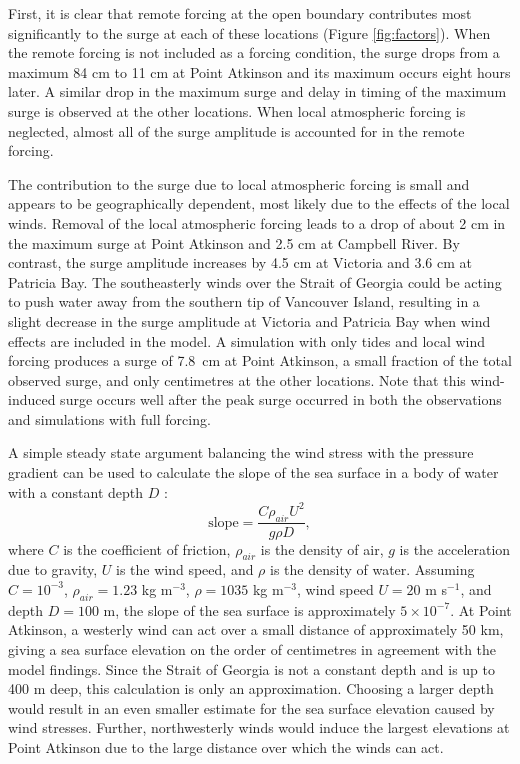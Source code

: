 \documentclass[letterpaper]{tATO2e}
\begin{document}
First, it is clear that remote forcing at the open boundary contributes most significantly to the surge at each of these locations (Figure \ref{fig:factors}). When the remote forcing is not included as a forcing condition, the surge drops from a maximum {\color{red}84 cm} to 11 cm at Point Atkinson and its maximum occurs eight hours later.  A similar drop in the maximum surge and delay in timing of the maximum surge is observed at the other locations.  When local atmospheric forcing is neglected, almost all of the surge amplitude is accounted for in the remote forcing.

The contribution to the surge due to local atmospheric forcing is small and appears to be geographically dependent, most likely due to the effects of the local winds. Removal of the local atmospheric forcing leads to a drop of about {\color{red}2 cm} in the maximum surge at Point Atkinson and {\color{red}2.5 cm} at Campbell River. By contrast, the surge amplitude increases by {\color{red} 4.5 cm} at Victoria and 3.6 cm at Patricia Bay. The southeasterly winds over the Strait of Georgia could be acting to push water away from the southern tip of Vancouver Island, resulting in a slight decrease in the surge amplitude at Victoria and Patricia Bay when wind effects are included in the model. A simulation with only tides and local wind forcing produces a surge of 7.8~cm at Point Atkinson, a small fraction of the total observed surge, and only centimetres at the other locations.  Note that this wind-induced surge occurs well after the peak surge occurred in both the observations and simulations with full forcing.

A simple steady state argument balancing the wind stress with the pressure gradient can be used to calculate the slope of the sea surface in a body of water with a constant depth $D$ \citep{pugh2004changing}: 
\begin{equation}
\text{slope} = \frac{C\rho_{air}U^2}{g\rho D},
\end{equation}
where $C$ is the coefficient of friction, $\rho_{air}$ is the density of air, $g$ is the acceleration due to gravity, $U$ is the wind speed, and $\rho$ is the density of water. Assuming  $C=10^{-3}$, $\rho_{air}=1.23$ kg m$^{-3}$, $\rho= 1035$  kg m$^{-3}$, wind speed $U=20$ m s$^{-1}$, and depth $D=100$ m, the slope of the sea surface is approximately $5\times10^{-7}$. At Point Atkinson, a westerly wind can act over a small distance of approximately 50 km, giving a sea surface elevation on the order of centimetres in agreement with the model findings. Since the Strait of Georgia is not a constant depth and is up to 400 m deep, this calculation is only an approximation. Choosing a larger depth would result in an even smaller estimate for the sea surface elevation caused by wind stresses. Further, northwesterly winds would induce the largest elevations at Point Atkinson due to the large distance over which the winds can act. 
\end{document}
